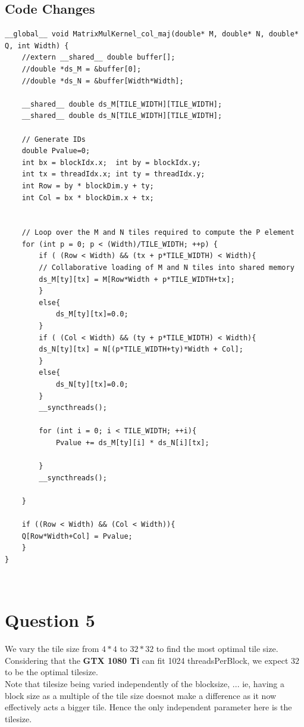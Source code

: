 \subsection{Code Changes} 
\begin{lstlisting}
__global__ void MatrixMulKernel_col_maj(double* M, double* N, double* Q, int Width) { 
    //extern __shared__ double buffer[];
    //double *ds_M = &buffer[0];
    //double *ds_N = &buffer[Width*Width];

    __shared__ double ds_M[TILE_WIDTH][TILE_WIDTH];
    __shared__ double ds_N[TILE_WIDTH][TILE_WIDTH];

    // Generate IDs
    double Pvalue=0;
    int bx = blockIdx.x;  int by = blockIdx.y;
    int tx = threadIdx.x; int ty = threadIdx.y;
    int Row = by * blockDim.y + ty;
    int Col = bx * blockDim.x + tx;

    
    // Loop over the M and N tiles required to compute the P element
    for (int p = 0; p < (Width)/TILE_WIDTH; ++p) {
        if ( (Row < Width) && (tx + p*TILE_WIDTH) < Width){
        // Collaborative loading of M and N tiles into shared memory
        ds_M[ty][tx] = M[Row*Width + p*TILE_WIDTH+tx];
        }
        else{
            ds_M[ty][tx]=0.0;
        }
        if ( (Col < Width) && (ty + p*TILE_WIDTH) < Width){
        ds_N[ty][tx] = N[(p*TILE_WIDTH+ty)*Width + Col];
        }
        else{
            ds_N[ty][tx]=0.0;
        }
        __syncthreads();

        for (int i = 0; i < TILE_WIDTH; ++i){
            Pvalue += ds_M[ty][i] * ds_N[i][tx];
            
        }
        __syncthreads();
        
    }
    
    if ((Row < Width) && (Col < Width)){
    Q[Row*Width+Col] = Pvalue;
    }
}
\end{lstlisting} \\


\section {Question 5}

We vary the tile size from $4*4$ to $32*32$ to  find the most optimal tile size. Considering that the \textbf{GTX 1080 Ti} can fit 1024 threadsPerBlock, we expect $32$ to be the optimal tilesize. \\

Note that tilesize being varied independently of the blocksize, ... ie, having a block size as a multiple of the tile size doesnot make a difference as it now effectively acts a bigger tile. Hence the only independent parameter here is the tilesize. \\

